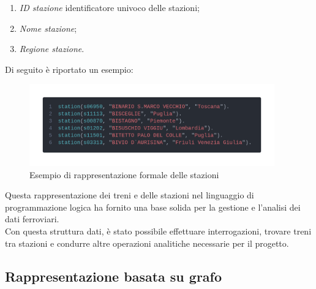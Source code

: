 \documentclass[italian,12pt,a4paper]{article}
\begin{document}
			\begin{enumerate}
				\item \textit{ID stazione} identificatore univoco delle stazioni;
				\item \textit{Nome stazione};
				\item \textit{Regione stazione}.
			\end{enumerate}
			Di seguito è riportato un esempio:
		
			\begin{figure}[!h]
				\centering
				\includegraphics[width=400px]{img/code_prolog2}
				\caption{Esempio di rappresentazione formale delle stazioni}
			\end{figure}
			\vspace{10px}
			\setlength{\parindent}{0cm}
			Questa rappresentazione dei treni e delle stazioni nel linguaggio di programmazione logica ha fornito una base solida per la gestione e l'analisi dei dati ferroviari. \\
			\linebreak
			Con questa struttura dati, è stato possibile effettuare interrogazioni, trovare treni tra stazioni e condurre altre operazioni analitiche necessarie per il progetto.

		\subsection{Rappresentazione basata su grafo}
\end{document}
